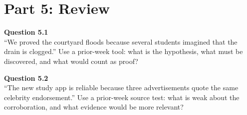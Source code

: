 \documentclass[12pt]{article}
\begin{document}

\newpage

\section*{Part 5: Review}

\textbf{Question 5.1}\\[-0.15em]
``We proved the courtyard floods because several students imagined that the drain is clogged.'' Use a prior-week tool: what is the hypothesis, what must be discovered, and what would count as proof?


\textbf{Question 5.2}\\[-0.15em]
``The new study app is reliable because three advertisements quote the same celebrity endorsement.'' Use a prior-week source test: what is weak about the corroboration, and what evidence would be more relevant?

\end{document}
